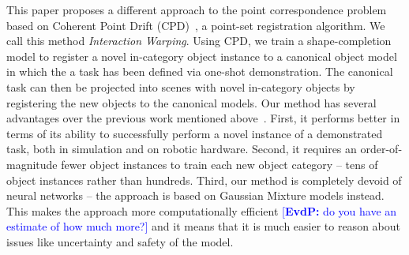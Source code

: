 \documentclass{article}
\newcommand{\evdp}[1]{\textcolor{blue}{[\textbf{EvdP:} #1]}}
\begin{document}




This paper proposes a different approach to the point correspondence problem based on Coherent Point Drift (CPD)~\cite{myronenko2010point}, a point-set registration algorithm. We call this method \emph{Interaction Warping}. Using CPD, we train a shape-completion model to register a novel in-category object instance to a canonical object model in which the a task has been defined via one-shot demonstration. The canonical task can then be projected into scenes with novel in-category objects by registering the new objects to the canonical models. Our method has several advantages over the previous work mentioned above~\cite{pan2022tax,wang2019dynamic,manuelli2019kpam}. First, it performs better in terms of its ability to successfully perform a novel instance of a demonstrated task, both in simulation and on robotic hardware. Second, it requires an order-of-magnitude fewer object instances to train each new object category -- tens of object instances rather than hundreds. Third, our method is completely devoid of neural networks -- the approach is based on Gaussian Mixture models instead. This makes the approach more computationally efficient \evdp{do you have an estimate of how much more?} and it means that it is much easier to reason about issues like uncertainty and safety of the model. 
\end{document}
